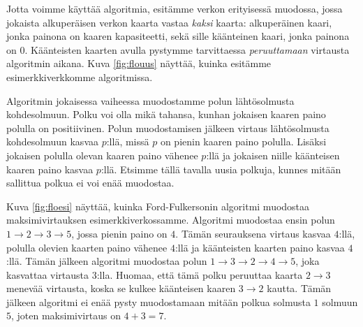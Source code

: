 Jotta voimme käyttää algoritmia, esitämme verkon
erityisessä muodossa, jossa jokaista alkuperäisen verkon
kaarta vastaa \emph{kaksi} kaarta:
alkuperäinen kaari, jonka painona on kaaren kapasiteetti,
sekä sille kään\-teinen kaari, jonka painona on $0$.
Käänteisten kaarten avulla pystymme tarvittaessa \emph{peruuttamaan}
virtausta algoritmin aikana.
Kuva \ref{fig:flouus} näyttää, kuinka esitämme esimerkkiverkkomme algoritmissa.

Algoritmin jokaisessa vaiheessa muodostamme polun
lähtösolmusta kohdesolmuun.
Polku voi olla mikä tahansa, kunhan jokaisen kaaren paino
polulla on positiivinen.
Polun muodostamisen jälkeen virtaus lähtösolmusta kohdesolmuun
kasvaa $p$:llä, missä $p$ on pienin kaaren paino polulla.
Lisäksi jokaisen polulla olevan kaaren paino vähenee $p$:llä
ja jokaisen niille käänteisen kaaren paino kasvaa $p$:llä.
Etsimme tällä tavalla uusia polkuja, kunnes mitään sallittua
polkua ei voi enää muodostaa.

Kuva \ref{fig:floesi} näyttää, kuinka Ford-Fulkersonin algoritmi muodostaa
maksimivirtauksen esimerkkiverkossamme.
Algoritmi muodostaa ensin polun $1 \rightarrow 2 \rightarrow 3 \rightarrow 5$,
jossa pienin paino on $4$.
Tämän seurauksena virtaus kasvaa $4$:llä,
polulla olevien kaarten paino vähenee $4$:llä
ja käänteisten kaarten paino kasvaa $4$:llä.
Tämän jälkeen algoritmi muodostaa polun
$1 \rightarrow 3 \rightarrow 2 \rightarrow 4 \rightarrow 5$,
joka kasvattaa virtausta $3$:lla.
Huomaa, että tämä polku peruuttaa
kaarta $2 \rightarrow 3$ menevää virtausta,
koska se kulkee käänteisen kaaren $3 \rightarrow 2$ kautta.
Tämän jälkeen algoritmi ei enää pysty muodostamaan mitään polkua
solmusta $1$ solmuun $5$, joten maksimivirtaus on $4+3=7$.

